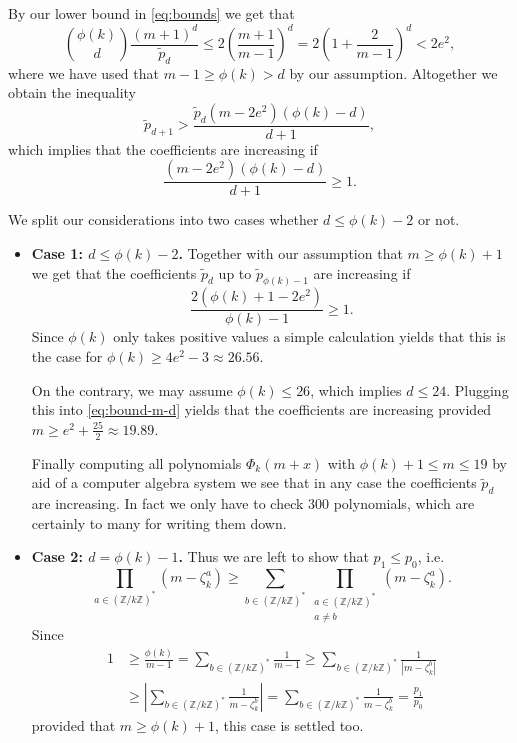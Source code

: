 \documentclass{amsart}
\theoremstyle{plain}
\numberwithin{equation}{section}
\theoremstyle{remark}
\begin{document}
By our lower bound in \eqref{eq:bounds} we get that
\[\binom{\phi(k)}{d}\frac{(m+1)^d}{\tilde p_d}\leq2\left(\frac{m+1}{m-1}\right)^d=2\left(1+\frac{2}{m-1}\right)^d<2e^2,\]
where we have used that $m-1\geq\phi(k)>d$ by our assumption. Altogether we
obtain the inequality
\[\tilde p_{d+1}> \frac{\tilde p_d(m-2e^2)(\phi(k)-d)}{d+1},\]
which implies that the coefficients are increasing if 
\begin{equation}\label{eq:bound-m-d}
\frac{(m-2e^2)(\phi(k)-d)}{d+1}\geq1.
\end{equation}

We split our considerations into two cases whether $d\leq\phi(k)-2$ or not.
\begin{itemize}
\item\textbf{Case 1: $d\leq\phi(k)-2$.} Together with our assumption
  that $m\geq\phi(k)+1$ we get that the coefficients $\tilde p_d$ up
  to $\tilde p_{\phi(k)-1}$ are increasing
  if $$\frac{2(\phi(k)+1-2e^2)}{\phi(k)-1}\geq1.$$ Since $\phi(k)$ only
  takes positive values a simple calculation yields that this is the
  case for $\phi(k)\geq 4e^2-3\approx 26.56$.

  On the contrary, we may assume $\phi(k)\leq 26$, which implies
  $d\leq24$. Plugging this into \eqref{eq:bound-m-d} yields that the
  coefficients are increasing provided $m\geq e^2+\frac{25}2\approx
  19.89$.

  Finally computing all polynomials $\Phi_k(m+x)$ with $\phi(k)+1\leq
  m\leq 19$ by aid of a computer algebra system we see that in any
  case the coefficients $\tilde p_d$ are increasing. In fact we only
  have to check 300 polynomials, which are certainly to many for
  writing them down.
\item\textbf{Case 2: $d=\phi(k)-1$.} Thus we are left to show that
  $p_1\leq p_0$, i.e.
\[\prod_{a \in ({{\mathbb Z}}/k{{\mathbb Z}})^*}(m-\zeta_k^a) \geq \sum_{b \in ({{\mathbb Z}}/k{{\mathbb Z}})^*}\prod_{\substack{a \in ({{\mathbb Z}}/k{{\mathbb Z}})^*\\ a\neq b}}(m-\zeta_k^a).\]
Since
\begin{align*}
1&\geq \frac{\phi(k)}{m-1}
  =\sum_{b \in ({{\mathbb Z}}/k{{\mathbb Z}})^*}\frac{1}{m-1}
  \geq\sum_{b \in ({{\mathbb Z}}/k{{\mathbb Z}})^*}\frac{1}{\left| m-\zeta_k^b\right|}\\
&\geq\left|\sum_{b \in ({{\mathbb Z}}/k{{\mathbb Z}})^*}\frac{1}{m-\zeta_k^b}\right|
=\sum_{b \in ({{\mathbb Z}}/k{{\mathbb Z}})^*}\frac{1}{m-\zeta_k^b}=\frac{p_1}{p_0}
\end{align*}
provided that $m\geq\phi(k)+1$, this case is settled too.
\end{itemize}
\end{document}
